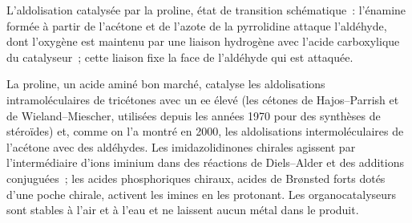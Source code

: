 \begin{omfigure}

{\small L'aldolisation catalysée par la proline, état de transition
schématique~: l'énamine formée à partir de l'acétone et de l'azote de la
pyrrolidine attaque l'aldéhyde, dont l'oxygène est maintenu par une liaison
hydrogène avec l'acide carboxylique du catalyseur~; cette liaison fixe la
face de l'aldéhyde qui est attaquée.}
\end{omfigure}

La proline, un acide aminé bon marché, catalyse les aldolisations
intramoléculaires de tricétones avec un ee élevé (les cétones de
Hajos--Parrish et de Wieland--Miescher, utilisées depuis les années 1970
pour des synthèses de stéroïdes) et, comme on l'a montré en 2000, les
aldolisations intermoléculaires de l'acétone avec des aldéhydes. Les
imidazolidinones chirales agissent par l'intermédiaire d'ions iminium dans
des réactions de Diels--Alder et des additions conjuguées~; les acides
phosphoriques chiraux, acides de Brønsted forts dotés d'une poche chirale,
activent les imines en les protonant. Les organocatalyseurs sont stables à
l'air et à l'eau et ne laissent aucun métal dans le produit.

